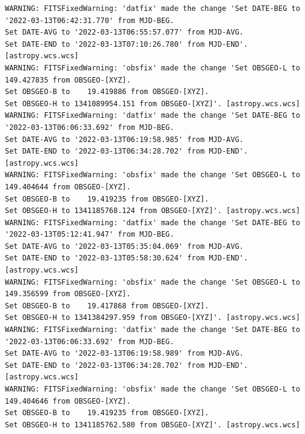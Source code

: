 \documentclass[11pt]{article}
\begin{document}
    \begin{Verbatim}[commandchars=\\\{\}]
WARNING: FITSFixedWarning: 'datfix' made the change 'Set DATE-BEG to
'2022-03-13T06:42:31.770' from MJD-BEG.
Set DATE-AVG to '2022-03-13T06:55:57.077' from MJD-AVG.
Set DATE-END to '2022-03-13T07:10:26.780' from MJD-END'. [astropy.wcs.wcs]
WARNING: FITSFixedWarning: 'obsfix' made the change 'Set OBSGEO-L to
149.427835 from OBSGEO-[XYZ].
Set OBSGEO-B to    19.419886 from OBSGEO-[XYZ].
Set OBSGEO-H to 1341089954.151 from OBSGEO-[XYZ]'. [astropy.wcs.wcs]
WARNING: FITSFixedWarning: 'datfix' made the change 'Set DATE-BEG to
'2022-03-13T06:06:33.692' from MJD-BEG.
Set DATE-AVG to '2022-03-13T06:19:58.985' from MJD-AVG.
Set DATE-END to '2022-03-13T06:34:28.702' from MJD-END'. [astropy.wcs.wcs]
WARNING: FITSFixedWarning: 'obsfix' made the change 'Set OBSGEO-L to
149.404644 from OBSGEO-[XYZ].
Set OBSGEO-B to    19.419235 from OBSGEO-[XYZ].
Set OBSGEO-H to 1341185768.124 from OBSGEO-[XYZ]'. [astropy.wcs.wcs]
WARNING: FITSFixedWarning: 'datfix' made the change 'Set DATE-BEG to
'2022-03-13T05:12:41.947' from MJD-BEG.
Set DATE-AVG to '2022-03-13T05:35:04.069' from MJD-AVG.
Set DATE-END to '2022-03-13T05:58:30.624' from MJD-END'. [astropy.wcs.wcs]
WARNING: FITSFixedWarning: 'obsfix' made the change 'Set OBSGEO-L to
149.356599 from OBSGEO-[XYZ].
Set OBSGEO-B to    19.417868 from OBSGEO-[XYZ].
Set OBSGEO-H to 1341384297.959 from OBSGEO-[XYZ]'. [astropy.wcs.wcs]
WARNING: FITSFixedWarning: 'datfix' made the change 'Set DATE-BEG to
'2022-03-13T06:06:33.692' from MJD-BEG.
Set DATE-AVG to '2022-03-13T06:19:58.989' from MJD-AVG.
Set DATE-END to '2022-03-13T06:34:28.702' from MJD-END'. [astropy.wcs.wcs]
WARNING: FITSFixedWarning: 'obsfix' made the change 'Set OBSGEO-L to
149.404646 from OBSGEO-[XYZ].
Set OBSGEO-B to    19.419235 from OBSGEO-[XYZ].
Set OBSGEO-H to 1341185762.580 from OBSGEO-[XYZ]'. [astropy.wcs.wcs]
    \end{Verbatim}
\end{document}
